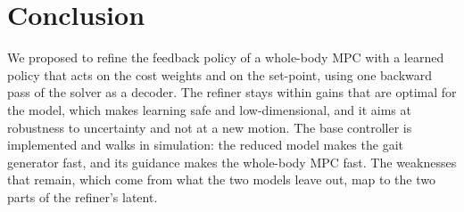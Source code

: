 \documentclass[conference]{IEEEtran}
\begin{document}
\section{Conclusion}
We proposed to refine the feedback policy of a whole-body MPC with a learned policy that acts on the cost weights and on the set-point, using one backward pass of the solver as a decoder.
The refiner stays within gains that are optimal for the model, which makes learning safe and low-dimensional, and it aims at robustness to uncertainty and not at a new motion.
The base controller is implemented and walks in simulation: the reduced model makes the gait generator fast, and its guidance makes the whole-body MPC fast.
The weaknesses that remain, which come from what the two models leave out, map to the two parts of the refiner's latent.

\begingroup
\renewcommand{\footnotesize}{\fontsize{7.5}{8.6}\selectfont}


\endgroup
\end{document}
